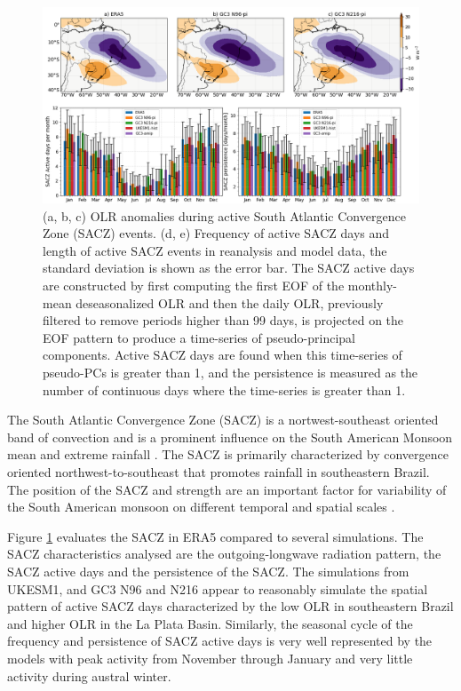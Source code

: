 \begin{figure}[t!]
\includegraphics[width=\linewidth]{figures/saczanalysis.png}
\caption{(a, b, c) OLR anomalies during active South Atlantic Convergence Zone (SACZ) events. (d, e) Frequency of active SACZ days and length of active SACZ events in reanalysis and model data, the standard deviation is shown as the error bar. The SACZ active days are constructed by first computing the first EOF of the monthly-mean deseasonalized OLR and then the daily OLR, previously filtered to remove periods higher than 99 days, is projected on the EOF pattern to produce a time-series of pseudo-principal components. Active SACZ days are found when this time-series of pseudo-PCs is greater than 1, and the persistence is measured as the number of continuous days where the time-series is greater than 1.}
\label{fig:sacz}
\end{figure}

 The South Atlantic Convergence Zone (SACZ) is a nortwest-southeast oriented band of convection and is a prominent influence on the South American Monsoon mean and extreme rainfall \citep{carvalho2004,marengo2012,jorgetti2014}. The SACZ is primarily characterized by convergence oriented northwest-to-southeast that promotes rainfall in southeastern Brazil. The position of the SACZ and strength are an important factor for variability of the South American monsoon on different temporal and spatial scales \citep{carvalho2004,marengo2012,jorgetti2014}. 
 
 Figure \ref{fig:sacz} evaluates the SACZ in ERA5 compared to several simulations. The SACZ characteristics analysed are the outgoing-longwave radiation pattern, the SACZ active days and the persistence of the SACZ.
The simulations from UKESM1, and GC3 N96 and N216 appear to reasonably simulate the spatial pattern of active SACZ days characterized by the low OLR in southeastern Brazil and higher OLR in the La Plata Basin. Similarly, the seasonal cycle of the frequency and persistence of SACZ active days is very well represented by the models with peak activity from November through January and very little activity during austral winter. 




